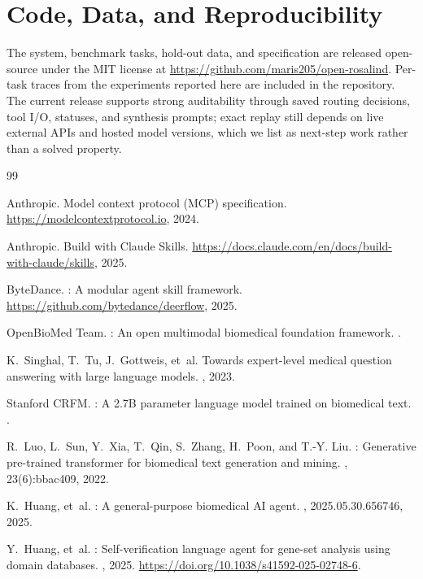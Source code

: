 \documentclass[11pt,letterpaper]{article}
\begin{document}
\section*{Code, Data, and Reproducibility}
The system, benchmark tasks, hold-out data, and specification are released open-source under the MIT license at \url{https://github.com/maris205/open-rosalind}. Per-task traces from the experiments reported here are included in the repository. The current release supports strong auditability through saved routing decisions, tool I/O, statuses, and synthesis prompts; exact replay still depends on live external APIs and hosted model versions, which we list as next-step work rather than a solved property.


\begin{thebibliography}{99}

Anthropic.
\newblock Model context protocol (MCP) specification.
\newblock \url{https://modelcontextprotocol.io}, 2024.

Anthropic.
\newblock Build with Claude Skills.
\newblock \url{https://docs.claude.com/en/docs/build-with-claude/skills}, 2025.

ByteDance.
: A modular agent skill framework.
\newblock \url{https://github.com/bytedance/deerflow}, 2025.

{OpenBioMed Team}.
: An open multimodal biomedical foundation framework.
.

K.~Singhal, T.~Tu, J.~Gottweis, et~al.
\newblock Towards expert-level medical question answering with large language
  models.
, 2023.

{Stanford CRFM}.
: A 2.7{B} parameter language model trained on biomedical
  text.
.

R.~Luo, L.~Sun, Y.~Xia, T.~Qin, S.~Zhang, H.~Poon, and T.-Y. Liu.
: Generative pre-trained transformer for biomedical text
  generation and mining.
, 23(6):bbac409, 2022.

K.~Huang, et~al.
: A general-purpose biomedical {AI} agent.
, 2025.05.30.656746, 2025.

Y.~Huang, et~al.
: Self-verification language agent for gene-set analysis using domain databases.
, 2025.
\newblock \url{https://doi.org/10.1038/s41592-025-02748-6}.


\end{thebibliography}
\end{document}
